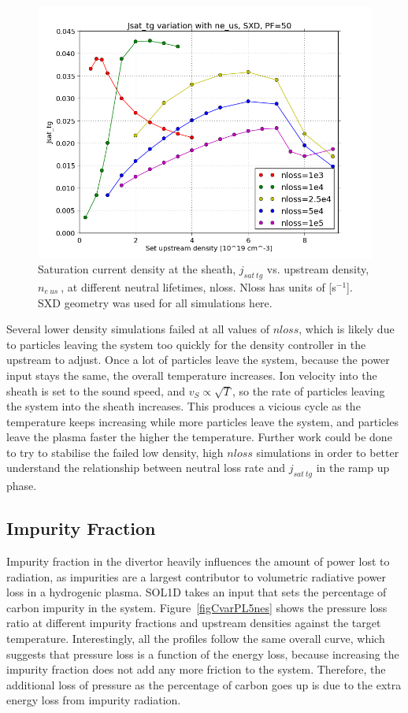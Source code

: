 \documentclass[12pt]{article}  %
\providecommand{\pow}[1]{{$^{#1}$}} %
\providecommand{\neus}{$n_{e~us}~$} %
\begin{document}
\begin{figure}
\includegraphics[scale=0.5]{Figures/sol1d/nloss1e345,525e425_2.png}
\centering
\caption{Saturation current density at the sheath, $j_{sat~tg}$ vs. upstream density, \neus, at different neutral lifetimes, nloss. Nloss has units of [s\pow{-1}]. SXD geometry was used for all simulations here.}\label{fignloss1e345,52.5e425_2}
\end{figure}

Several lower density simulations failed at all values of $nloss$, which is likely due to particles leaving the system too quickly for the density controller in the upstream to adjust. Once a lot of particles leave the system, because the power input stays the same, the overall temperature increases. Ion velocity into the sheath is set to the sound speed, and $v_S \propto \sqrt{T}$, so the rate of particles leaving the system into the sheath increases. This produces a vicious cycle as the temperature keeps increasing while more particles leave the system, and particles leave the plasma faster the higher the temperature. Further work could be done to try to stabilise the failed low density, high $nloss$ simulations in order to better understand the relationship between neutral loss rate and $j_{sat~tg}$ in the ramp up phase.



\subsection{Impurity Fraction}\label{ssecImpfrac}
Impurity fraction in the divertor heavily influences the amount of power lost to radiation, as impurities are a largest contributor to volumetric radiative power loss in a hydrogenic plasma. SOL1D takes an input that sets the percentage of carbon impurity in the system. Figure~\ref{figCvarPL5nes} shows the pressure loss ratio at different impurity fractions and upstream densities against the target temperature. Interestingly, all the profiles follow the same overall curve, which suggests that pressure loss is a function of the energy loss, because increasing the impurity fraction does not add any more friction to the system. Therefore, the additional loss of pressure as the percentage of carbon goes up is due to the extra energy loss from impurity radiation.
\end{document}
